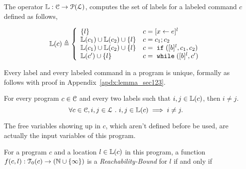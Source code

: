 The operator $\mathbb{L}: \mathcal{C} \to \mathcal{P}(\mathcal{L})$,
computes the set of labels
for a labeled command $c$ defined as follows,
%
\begin{defn}
\label{def:lvar}
{\small
$$
  \lvar(c) \triangleq
  \left\{
  \begin{array}{ll}
      \{l\}                  
      & {c} = [{\assign x e}]^{l} 
      \\
      \lvar({c_1}) \cup \lvar({{c_2}})  \cup \{l\} 
      & {c} = {c_1};{c_2}
      \\
      \lvar(c_1) \cup \lvar({{c_2}}) \cup \{l\} 
      & {c} =\eif([\bexpr]^{l}, c_1, c_2) 
      \\
      \lvar({{c}'}) \cup \{l\} 
      & {c}   = \ewhile ([\bexpr]^{l}, {c}')
\end{array}
\right.
$$
}
\end{defn}
%
Every label and every labeled command in a program is unique, formally as follows with proof in Appendix~\ref{apdx:lemma_sec123}.
\begin{lem}
  \label{lem:label_unique}
  For every program $c \in \mathcal{C}$ and every two labels such that
  $i, j \in \mathbb{L}(c)$, then $i \neq j$.
  \[
    \forall c \in \mathcal{C}, i, j \in \mathcal{L} ~.~ i, j \in \mathbb{L}(c)\implies i \neq j.
    \]
\end{lem}
%
The free variables
showing up in $c$, which aren't defined before be used, are actually the input variables of this program.
%
\begin{defn}
  \label{def:rb}
  For a program ${c}$ and a location $l \in \mathbb{L}(c)$ in this program,
a function $f(c, l) : \mathcal{T}_0(c) \to (\mathbb{N} \cup \{\infty\})$ is a \emph{Reachability-Bound} for $l$ if and only if
\end{defn}
